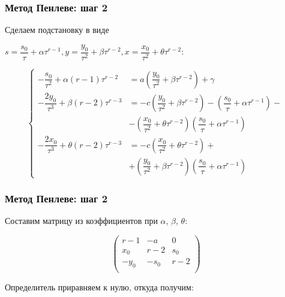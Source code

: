 \documentclass[14pt]{beamer}
\begin{document}
\begin{frame}

\frametitle{Метод Пенлеве: шаг 2}

\small{Сделаем подстановку в виде
 
\vspace{10pt} $ 
s = \dfrac{s_0}{\tau} + \alpha \tau^{r-1},
y = \dfrac{y_0}{\tau^2} + \beta \tau^{r-2},                         x = \dfrac{x_0}{\tau^2} + \theta \tau^{r-2} $:

$$
        \left\{
                \begin{aligned}
                        -\dfrac{s_0}{\tau^{2}} + \alpha (r-1) \tau^{r-2} &= a \left( \dfrac{y_0}{\tau^2} + \beta \tau^{r-2} \right) + \gamma \\
                        -\dfrac{2y_0}{\tau^{3}} + \beta (r-2) \tau^{r-3} &= -c \left( \dfrac{y_0}{\tau^2} + \beta \tau^{r-2} \right) - \left( \dfrac{s_0}{\tau} + \alpha \tau^{r-1} \right) - \\ &- \left( \dfrac{x_0}{\tau^2} + \theta \tau^{r-2} \right) \left( \dfrac{s_0}{\tau} + \alpha \tau^{r-1} \right) \\
                        -\dfrac{2x_0}{\tau^{3}} + \theta (r-2) \tau^{r-3} &= -c \left( \dfrac{x_0}{\tau^2} + \theta \tau^{r-2} \right) + \\ &+ \left( \dfrac{y_0}{\tau^2} + \beta \tau^{r-2} \right) \left( \dfrac{s_0}{\tau} + \alpha \tau^{r-1} \right)
                \end{aligned}
        \right.
$$
}

\end{frame}



\begin{frame}

\frametitle{Метод Пенлеве: шаг 2}

Составим матрицу из коэффициентов при $ \alpha $, $ \beta $, $ \theta $:

$$
\left(
                \begin{array}{ccc}
                        r-1 & -a & 0 \\
                        x_0 & r-2 & s_0 \\
                        -y_0 & -s_0 & r-2 \\
                \end{array}
\right)
$$

Определитель приравняем к нулю, откуда получим:


\end{frame}
\end{document}
